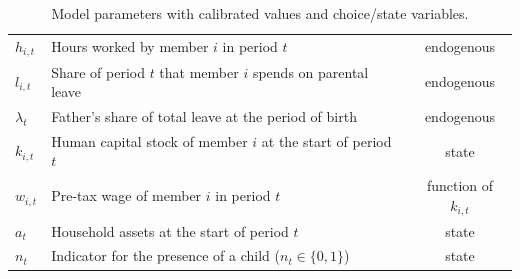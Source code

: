 \begin{table}[h]
\begin{tabular}{@{}llc@{}}
$h_{i,t}$      & Hours worked by member $i$ in period $t$                             & endogenous \\
$l_{i,t}$      & Share of period $t$ that member $i$ spends on parental leave         & endogenous \\
$\lambda_t$    & Father's share of total leave at the period of birth                 & endogenous \\
$k_{i,t}$      & Human capital stock of member $i$ at the start of period $t$         & state \\
$w_{i,t}$      & Pre-tax wage of member $i$ in period $t$                             & function of $k_{i,t}$ \\
$a_t$          & Household assets at the start of period $t$                          & state \\
$n_t$          & Indicator for the presence of a child ($n_t \in \{0,1\}$)            & state \\
\bottomrule
\end{tabular}
\caption{Model parameters with calibrated values and choice/state variables. }
\label{tab:params}
\end{table}
